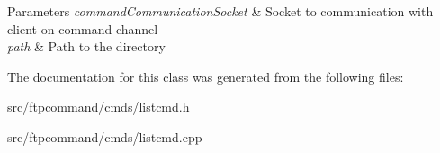 \begin{DoxyParams}{Parameters}
{\em command\+Communication\+Socket} & Socket to communication with client on command channel \\
\hline
{\em path} & Path to the directory \\
\hline
\end{DoxyParams}


The documentation for this class was generated from the following files\+:\begin{DoxyCompactItemize}
\item 
src/ftpcommand/cmds/listcmd.\+h\item 
src/ftpcommand/cmds/listcmd.\+cpp\end{DoxyCompactItemize}
